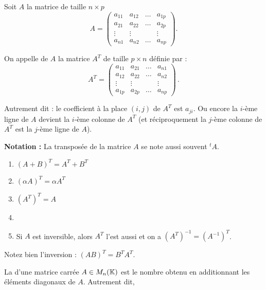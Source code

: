 \documentclass[10pt,class=article,crop=false]{standalone}
\begin{document}
\begin{multicols}{2}
Soit $A$ la matrice de taille $n\times p$
$$
A = \left(
\begin{array}{cccc}
	a_{11} & a_{12} & \dots & a_{1p}\\
	a_{21} & a_{22} & \dots & a_{2p}\\
	\vdots & \vdots &&\vdots\\
	a_{n1} & a_{n2} & \dots & a_{np}
\end{array}\right).
$$

\begin{definition}
	On appelle  de $A$ la matrice $A^T$ de taille $p \times n$
	définie par :
	$$
	A^T = \left(
	\begin{array}{cccc}
		a_{11} & a_{21} & \dots & a_{n1}\\
		a_{12} & a_{22} & \dots & a_{n2}\\
		\vdots & \vdots &&\vdots\\
		a_{1p} & a_{2p} &\dots & a_{np}
	\end{array}\right)\, .
	$$
\end{definition}

Autrement dit : le coefficient à la place $(i,j)$ de $A^T$  est $a_{ji}$.
Ou encore la $i$-ème ligne de $A$ devient la $i$-ème colonne de $A^{T}$
(et réciproquement la $j$-ème colonne de $A^T$ est la $j$-ème ligne de $A$).

\bigskip

{\bf Notation :} La transposée de la matrice $A$ se note aussi souvent $^{t\!}A$.


\begin{theoreme}
	\sauteligne
	\begin{enumerate}
		\item $(A + B)^T = A^T + B^T$
		\item $(\alpha A)^T = \alpha A^T $
		\item $(A^T)^T = A$
		\item {}
		\item Si $A$ est inversible, alors $A^T$ l'est aussi et on a $(A^T)^{-1}=(A^{-1})^T$.
	\end{enumerate}
	\label{theotranspo}
\end{theoreme}

Notez bien l'inversion : $(AB)^T = B^T A^T$.



\begin{definition}
	La  d'une matrice carrée $A \in M_n(\mathbb{K})$ est
	le nombre obtenu en additionnant les éléments diagonaux de $A$.
	Autrement dit,
\end{definition}



\end{multicols}
\end{document}
